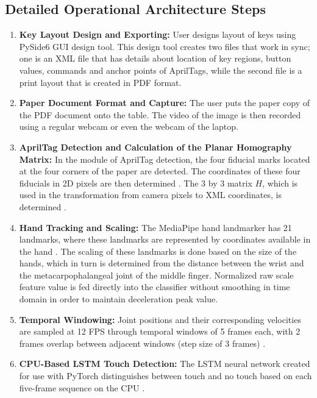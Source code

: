 \subsection{Detailed Operational Architecture Steps}
\begin{enumerate}
    \item \textbf{Key Layout Design and Exporting:} User designs layout of keys using PySide6 GUI design tool. This design tool creates two files that work in sync; one is an XML file that has details about location of key regions, button values, commands and anchor points of AprilTags, while the second file is a print layout that is created in PDF format.
    \item \textbf{Paper Document Format and Capture:} The user puts the paper copy of the PDF document onto the table. The video of the image is then recorded using a regular webcam or even the webcam of the laptop.
    \item \textbf{AprilTag Detection and Calculation of the Planar Homography Matrix:} In the module of AprilTag detection, the four fiducial marks located at the four corners of the paper are detected. The coordinates of these four fiducials in 2D pixels are then determined \cite{Wang2016AprilTag2, Kallwies2020Determining, Shabalina2018ARTag, Kalaitzakis2021Fiducial}. The 3 by 3 matrix $H$, which is used in the transformation from camera pixels to XML coordinates, is determined \cite{Pirchheim2011Homography, Herdiansyah2024Implementation, GarridoJurado2026ArUco}.
    \item \textbf{Hand Tracking and Scaling:} The MediaPipe hand landmarker has 21 landmarks, where these landmarks are represented by coordinates available in the hand \cite{Zhang2020MediaPipe, SanchezBrizuela2023Lightweight, Sreenath2021Monocular, Ivacko2024Edge, Andriyanov2025Improving}. The scaling of these landmarks is done based on the size of the hands, which in turn is determined from the distance between the wrist and the metacarpophalangeal joint of the middle finger. Normalized raw scale feature value is fed directly into the classifier without smoothing in time domain in order to maintain deceleration peak value.
    \item \textbf{Temporal Windowing:} Joint positions and their corresponding velocities are sampled at 12 FPS through temporal windows of 5 frames each, with 2 frames overlap between adjacent windows (step size of 3 frames) \cite{Simao2016Unsupervised, Gammulle2021TMMF}.
    \item \textbf{CPU-Based LSTM Touch Detection:} The LSTM neural network created for use with PyTorch distinguishes between touch and no touch based on each five-frame sequence on the CPU \cite{Hochreiter1997LSTM, GilMartin2023Hand, Doan2022Efficient, Nunez2018Convolutional, Lai2018CNN}.

\end{enumerate}
